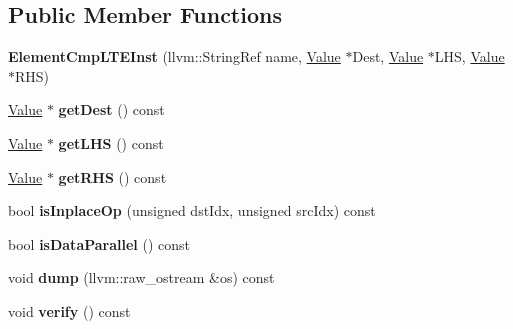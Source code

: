 \subsection*{Public Member Functions}
\begin{DoxyCompactItemize}
\item 
\mbox{\label{classglow_1_1_element_cmp_l_t_e_inst_adc6f6bb13d71f5f39d76f815f93eb8fc}} 
{\bfseries Element\+Cmp\+L\+T\+E\+Inst} (llvm\+::\+String\+Ref name, \hyperlink{classglow_1_1_value}{Value} $\ast$Dest, \hyperlink{classglow_1_1_value}{Value} $\ast$L\+HS, \hyperlink{classglow_1_1_value}{Value} $\ast$R\+HS)
\item 
\mbox{\label{classglow_1_1_element_cmp_l_t_e_inst_a0a8c7bfa7d73f76d4bde0a71a7f7c942}} 
\hyperlink{classglow_1_1_value}{Value} $\ast$ {\bfseries get\+Dest} () const
\item 
\mbox{\label{classglow_1_1_element_cmp_l_t_e_inst_a5008184c8ea4b6e97af825684be98e6c}} 
\hyperlink{classglow_1_1_value}{Value} $\ast$ {\bfseries get\+L\+HS} () const
\item 
\mbox{\label{classglow_1_1_element_cmp_l_t_e_inst_a26e5949a5ebe8ffbc4fac048b4d1fa85}} 
\hyperlink{classglow_1_1_value}{Value} $\ast$ {\bfseries get\+R\+HS} () const
\item 
\mbox{\label{classglow_1_1_element_cmp_l_t_e_inst_a2c7f299bcc80e7e59b4695f386e824e6}} 
bool {\bfseries is\+Inplace\+Op} (unsigned dst\+Idx, unsigned src\+Idx) const
\item 
\mbox{\label{classglow_1_1_element_cmp_l_t_e_inst_a9f646aadd8d3df2c3395f4c05fa49471}} 
bool {\bfseries is\+Data\+Parallel} () const
\item 
\mbox{\label{classglow_1_1_element_cmp_l_t_e_inst_addb34257eb02ea4e86909dd8e689a3fc}} 
void {\bfseries dump} (llvm\+::raw\+\_\+ostream \&os) const
\item 
\mbox{\label{classglow_1_1_element_cmp_l_t_e_inst_a9b3588a3b60f42abb98c99ed134f96e3}} 
void {\bfseries verify} () const
\end{DoxyCompactItemize}
